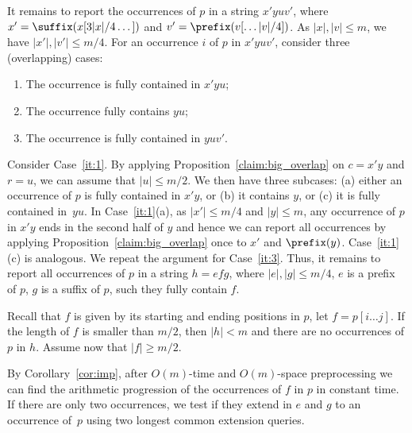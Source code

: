It remains to report the occurrences of $p$ in a string $x' yu v'$, where $x' = \suffix(x[3|x|/4 \dots])$ and $v' = \prefix(v[\dots |v|/4])$. As $|x|, |v| \le m$, we have $|x'|, |v'| \le m/4$. For an occurrence $i$ of $p$ in $x' yu v'$, consider three (overlapping) cases:
\begin{enumerate}
\item \label{it:1} The occurrence is fully contained in $x'yu$;
\item \label{it:2} The occurrence fully contains $yu$;
\item \label{it:3} The occurrence is fully contained in $yuv'$.
\end{enumerate}
Consider Case~\ref{it:1}. By applying  Proposition~\ref{claim:big_overlap} on $c = x'y$ and $r = u$, we can assume that $|u| \le m/2$. We then have three subcases: (a) either an occurrence of $p$ is fully contained in $x'y$, or (b) it contains $y$, or (c) it is fully contained in~$yu$. In Case~\ref{it:1}(a), as $|x'| \le m/4$ and $|y| \le m$, any occurrence of $p$ in $x'y$ ends in the second half of $y$ and hence we can report all occurrences by applying Proposition~\ref{claim:big_overlap} once to $x'$ and $\prefix(y)$. Case~\ref{it:1}(c) is analogous. We repeat the argument for Case~\ref{it:3}. Thus, it remains to report all occurrences of $p$ in a string $h=efg$, where $|e|, |g| \le m/4$, $e$ is a prefix of $p$, $g$ is a suffix of $p$, such they fully contain $f$.

Recall that $f$ is given by its starting and ending positions in $p$, let $f = p[i \dots j]$. If the length of $f$ is smaller than $m/2$, then $|h|<m$ and there are no occurrences of $p$ in $h$. Assume now that $|f| \ge m/2$.

 
By Corollary~\ref{cor:imp}, after $O(m)$-time and $O(m)$-space preprocessing we can find the arithmetic progression of the occurrences of $f$ in $p$ in constant time. If there are only two occurrences, we test if they extend in $e$ and $g$ to an occurrence of~$p$ using two longest common extension queries. 

